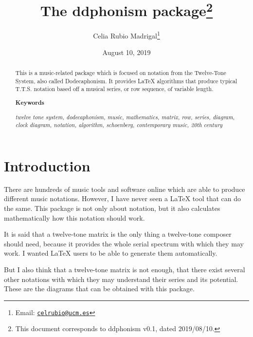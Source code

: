 \documentclass{article}
\title{The \textsf{ddphonism} package\footnote{This
		document corresponds to \textsf{ddphonism} v0.1, dated 2019/08/10.}}
\author{Celia Rubio Madrigal\footnote{Email: \href{mailto:celrubio@ucm.es}{\texttt{celrubio@ucm.es}}}}
\date{August 10, 2019}
\begin{document}
	
	\maketitle
	
	\begin{abstract}
		This is a music-related package which is focused on notation from the Twelve-Tone System, also called Dodecaphonism. It provides \LaTeX{} algorithms that produce typical T.T.S. notation based off a musical series, or row sequence, of variable length.
		
		\begin{center}
			\textbf{Keywords}
		\end{center}
	
		\textit{twelve tone system, dodecaphonism, music, mathematics, matrix, row, series, diagram, clock diagram, notation, algorithm, schoenberg, contemporary music, 20th century}
	\end{abstract}

	\tableofcontents
	
	\section{Introduction}
	There are hundreds of music tools and software online which are able to produce different music notations. However, I have never seen a \LaTeX{} tool that can do the same. This package is not only about notation, but it also calculates mathematically how this notation should work.
	
	It is said that a twelve-tone matrix is the only thing a twelve-tone composer should need, because it provides the whole serial spectrum with which they may work. I wanted \LaTeX{} users to be able to generate them automatically.
	
	But I also think that a twelve-tone matrix is not enough, that there exist several other notations with which they may understand their series and its potential. These are the diagrams that can be obtained with this package.
	
	\begin{multicols}{2}
		
		
		
		
		\bigskip
	\end{multicols}
	
\end{document}
